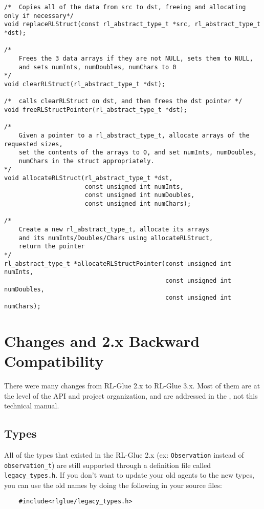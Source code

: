 \documentclass[11pt]{article}
\begin{document}
\begin{verbatim}
/*	Copies all of the data from src to dst, freeing and allocating only if necessary*/
void replaceRLStruct(const rl_abstract_type_t *src, rl_abstract_type_t *dst);

/*  
    Frees the 3 data arrays if they are not NULL, sets them to NULL, 
    and sets numInts, numDoubles, numChars to 0
*/
void clearRLStruct(rl_abstract_type_t *dst);

/*  calls clearRLStruct on dst, and then frees the dst pointer */
void freeRLStructPointer(rl_abstract_type_t *dst);

/*
    Given a pointer to a rl_abstract_type_t, allocate arrays of the requested sizes,
    set the contents of the arrays to 0, and set numInts, numDoubles,
    numChars in the struct appropriately.
*/
void allocateRLStruct(rl_abstract_type_t *dst, 
                      const unsigned int numInts,
                      const unsigned int numDoubles,
                      const unsigned int numChars);

/*
    Create a new rl_abstract_type_t, allocate its arrays 
    and its numInts/Doubles/Chars using allocateRLStruct, 
    return the pointer
*/
rl_abstract_type_t *allocateRLStructPointer(const unsigned int numInts,
                                            const unsigned int numDoubles,
                                            const unsigned int numChars);
\end{verbatim}



\section{Changes and 2.x Backward Compatibility}
There were many changes from RL-Glue 2.x to RL-Glue 3.x.  Most of them are at the level of the API and project organization, and are addressed in the , not this technical manual.

\subsection{Types}
All of the types that existed in the RL-Glue 2.x  (ex: \texttt{Observation} instead of \texttt{observation\_t}) are still supported through a definition file called 
\texttt{legacy\_types.h}.  If you don't want to update your old agents to the new types, you can use the old names by doing the following in your source files:
\begin{verbatim}
	#include<rlglue/legacy_types.h>
\end{verbatim}
\end{document}
